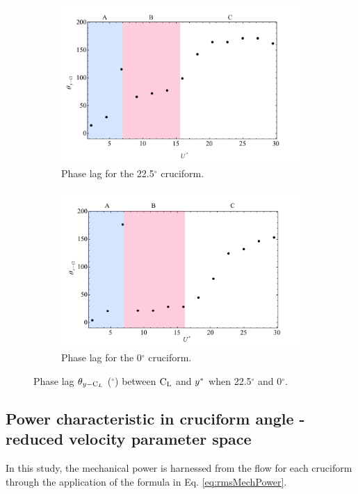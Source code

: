 \documentclass[oneside]{utmthesis}
\begin{document}
\begin{figure}
  \centering
  \begin{subfigure}[h]{1\textwidth}
    \includegraphics[width=\textwidth]{figs/phaseLag2}
    \caption{Phase lag for the 22.5$^{\circ}$ cruciform.}
    \label{fig:phaseLag225deg}
  \end{subfigure}
  
  \begin{subfigure}[h]{1\textwidth}
    \includegraphics[width=\textwidth]{figs/phaseLag1}
    \caption{Phase lag for the 0$^{\circ}$ cruciform.}
    \label{fig:phaseLag00deg}
  \end{subfigure}

  \caption{Phase lag $\theta_{y-\text{C}_{L}}$ ($^{\circ}$) between $\text{C}_{\text{L}}$ and $y^{*}$ when 22.5$^{\circ}$ and 0$^{\circ}$.}
  \label{fig:phaseLag22500deg}
\end{figure}

\subsection{Power characteristic in cruciform angle - reduced velocity parameter space}\label{ssec:powerCharacteristic}
In this study, the mechanical power is harnessed from the flow for each cruciform through the application of the formula in Eq. \ref{eq:rmsMechPower}.
\end{document}
